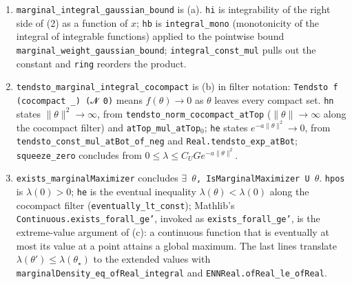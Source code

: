 \documentclass[11pt,a4paper]{article}
\begin{document}
\begin{leanbox}
\begin{enumerate}
\item \texttt{marginal\_\allowbreak{}integral\_\allowbreak{}gaussian\_\allowbreak{}bound} is (a). \texttt{hi} is integrability of the right side of (2) as a function of \(x\); \texttt{hb} is \texttt{integral\_\allowbreak{}mono} (monotonicity of the integral of integrable functions) applied to the pointwise bound \texttt{marginal\_\allowbreak{}weight\_\allowbreak{}gaussian\_\allowbreak{}bound}; \texttt{integral\_\allowbreak{}const\_\allowbreak{}mul} pulls out the constant and \texttt{ring} reorders the product.

\item \texttt{tendsto\_\allowbreak{}marginal\_\allowbreak{}integral\_\allowbreak{}cocompact} is (b) in filter notation: \texttt{Tendsto f (cocompact \_\allowbreak{}) ({\leanfallback 𝓝} 0)} means \(f(\theta)\to0\) as \(\theta\) leaves every compact set. \texttt{hn} states \(\|\theta\|^2\to\infty\), from \texttt{tendsto\_\allowbreak{}norm\_\allowbreak{}cocompact\_\allowbreak{}at\allowbreak{}Top} (\(\|\theta\|\to\infty\) along the cocompact filter) and \texttt{at\allowbreak{}Top\_\allowbreak{}mul\_\allowbreak{}at\allowbreak{}Top\ensuremath{{}_{0}}}; \texttt{he} states \(e^{-a\|\theta\|^2}\to0\), from \texttt{tendsto\_\allowbreak{}const\_\allowbreak{}mul\_\allowbreak{}at\allowbreak{}Bot\_\allowbreak{}of\_\allowbreak{}neg} and \texttt{Real.\allowbreak{}tendsto\_\allowbreak{}exp\_\allowbreak{}at\allowbreak{}Bot}; \texttt{squeeze\_\allowbreak{}zero} concludes from \(0\le\lambda\le C_UGe^{-a\|\theta\|^2}\).

\item \texttt{exists\_\allowbreak{}marginal\allowbreak{}Maximizer} concludes \texttt{\ensuremath{\exists} \ensuremath{\theta}, Is\allowbreak{}Marginal\allowbreak{}Maximizer U \ensuremath{\theta}}. \texttt{hpos} is \(\lambda(0)>0\); \texttt{he} is the eventual inequality \(\lambda(\theta)<\lambda(0)\) along the cocompact filter (\texttt{eventually\_\allowbreak{}lt\_\allowbreak{}const}); Mathlib's \texttt{Continuous.\allowbreak{}exists\_\allowbreak{}forall\_\allowbreak{}ge'}, invoked as \texttt{exists\_\allowbreak{}forall\_\allowbreak{}ge'}, is the extreme-value argument of (c): a continuous function that is eventually at most its value at a point attains a global maximum. The last lines translate \(\lambda(\theta')\le\lambda(\theta_\star)\) to the extended values with \texttt{marginal\allowbreak{}Density\_\allowbreak{}eq\_\allowbreak{}of\allowbreak{}Real\_\allowbreak{}integral} and \texttt{ENNReal.\allowbreak{}of\allowbreak{}Real\_\allowbreak{}le\_\allowbreak{}of\allowbreak{}Real}.

\end{enumerate}
\end{leanbox}
\end{document}

